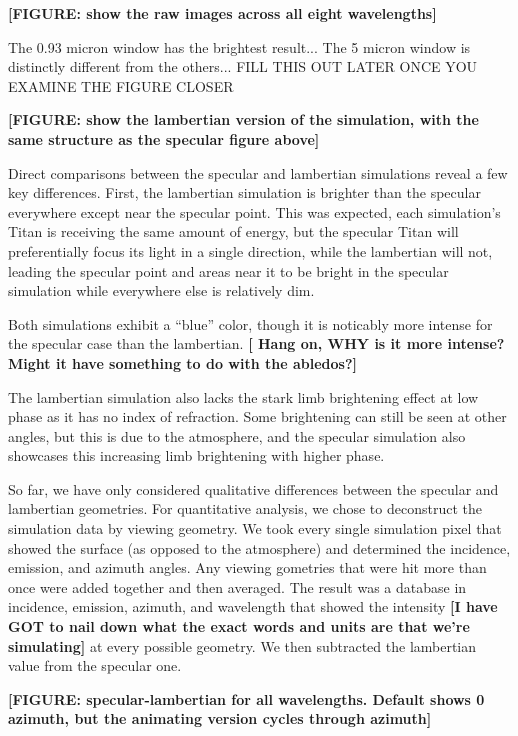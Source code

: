 \documentclass{article}
\begin{document}
\textbf{\color{red} [FIGURE: show the raw images across all eight wavelengths] \color{black}}

\color{Green}The 0.93 micron window has the brightest result... The 5 micron window is distinctly different from the others... FILL THIS OUT LATER ONCE YOU EXAMINE THE FIGURE CLOSER\color{black}

\textbf{\color{red} [FIGURE: show the lambertian version of the simulation, with the same structure as the specular figure above] \color{black}}

Direct comparisons between the specular and lambertian simulations reveal a few key differences. First, the lambertian simulation is brighter than the specular everywhere except near the specular point. This was expected, each simulation's Titan is receiving the same amount of energy, but the specular Titan will preferentially focus its light in a single direction, while the lambertian will not, leading the specular point and areas near it to be bright in the specular simulation while everywhere else is relatively dim. 

Both simulations exhibit a ``blue'' color, though it is noticably more intense for the specular case than the lambertian. \textbf{\color{red}[ Hang on, WHY is it more intense? Might it have something to do with the abledos?]\color{black}}

The lambertian simulation also lacks the stark limb brightening effect at low phase as it has no index of refraction. Some brightening can still be seen at other angles, but this is due to the atmosphere, and the specular simulation also showcases this increasing limb brightening with higher phase.

So far, we have only considered qualitative differences between the specular and lambertian geometries. For quantitative analysis, we chose to deconstruct the simulation data by viewing geometry. We took every single simulation pixel that showed the surface (as opposed to the atmosphere) and determined the incidence, emission, and azimuth angles. Any viewing gometries that were hit more than once were added together and then averaged. The result was a database in incidence, emission, azimuth, and wavelength that showed the intensity \textbf{\color{red}[I have GOT to nail down what the exact words and units are that we're simulating]\color{black}} at every possible geometry. We then subtracted the lambertian value from the specular one.

\textbf{\color{red} [FIGURE: specular-lambertian for all wavelengths. Default shows 0 azimuth, but the animating version cycles through azimuth] \color{black}}
\end{document}
